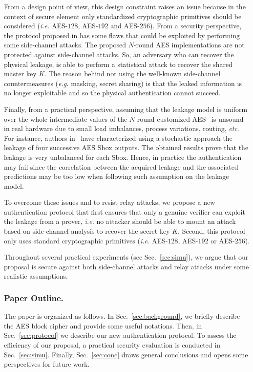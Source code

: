 \documentclass{llncs}
\begin{document}
From a design point of view, this design constraint raises an issue because in the context of secure element only standardized cryptographic primitives should be considered (\emph{i.e.} AES-$128$, AES-$192$ and AES-$256$). 
From a security perspective, the protocol proposed in \cite{SakiyamaMMKHMMN15} has some flaws that could be exploited by performing some side-channel attacks. The proposed $N$-round AES implementations are not protected against side-channel attacks. So, an adversary who can recover the physical leakage, is able to perform a statistical attack to recover the shared master key $K$.
The reason behind not using the well-known side-channel countermeasures (\emph{e.g.} masking, secret sharing) is that the leaked information is no longer exploitable and so the physical authentication cannot succeed.  

Finally, from a practical perspective, assuming that the leakage model is uniform over the whole intermediate values of the $N$-round customized AES~\cite{SakiyamaMMKHMMN15} is unsound in real hardware due to small load imbalances, process variations, routing, \emph{etc}. For instance, authors in~\cite{10.1007/978-3-642-42033-7_26} have characterized using a stochastic approach the leakage of four successive AES Sbox outputs.
The obtained results prove that the leakage is very unbalanced for each Sbox. Hence, in practice the authentication may fail since the correlation between the acquired leakage and the associated predictions may be too low when following such assumption on the leakage model.

To overcome these issues and to resist relay attacks, we propose a new authentication protocol that first ensures that only a genuine verifier can exploit the leakage from a prover, \emph{i.e.} no attacker should be able to mount an attack based on side-channel analysis to recover the secret key $K$. Second, this protocol only uses standard cryptographic primitives (\emph{i.e.} AES-$128$, AES-$192$ or AES-$256$).

Throughout several practical experiments (see Sec.~\ref{sec:simu}), we argue that our proposal is secure against both side-channel attacks and relay attacks under some realistic assumptions.

\subsubsection{Paper Outline.}
The paper is organized as follows. In Sec.~\ref{sec:background}, we briefly describe the AES block cipher and provide some useful notations. Then, in Sec.~\ref{sec:protocol} we describe our new authentication protocol. To assess the efficiency of our proposal, a practical security evaluation is conducted in Sec.~\ref{sec:simu}. Finally, Sec.~\ref{sec:conc} draws general conclusions and opens some perspectives for future work.
\end{document}
